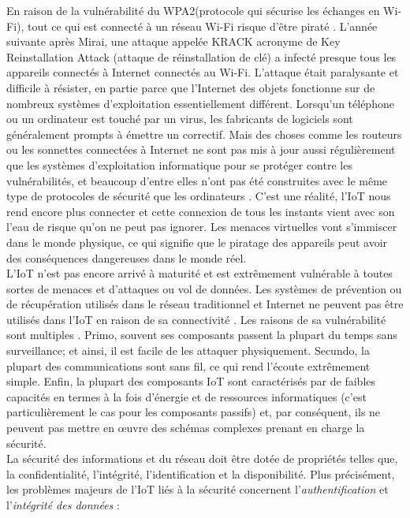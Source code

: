 En raison de la vulnérabilité du WPA2(protocole qui sécurise les échanges en Wi-Fi), tout ce qui est connecté à un réseau Wi-Fi risque d’être piraté \cite{kasperski201krack}. L'année suivante après Mirai, une attaque appelée KRACK acronyme de Key Reinstallation Attack (attaque de réinstallation de clé) a infecté presque tous les appareils connectés à Internet connectés au Wi-Fi. L'attaque était paralysante et dif{\kern0pt}f{\kern0pt}icile à résister, en partie parce que l'Internet des objets fonctionne sur de nombreux systèmes d'exploitation essentiellement dif{\kern0pt}férent. Lorsqu'un téléphone ou un ordinateur est touché par un virus, les fabricants de logiciels sont généralement prompts à émettre un correctif. Mais des choses comme les routeurs ou les sonnettes connectées à Internet ne sont pas mis à jour aussi régulièrement que les systèmes d’exploitation informatique pour se protéger contre les vulnérabilités, et beaucoup d'entre elles n'ont pas été construites avec le même type de protocoles de sécurité que les ordinateurs \cite{pardes2020iot}. C’est une réalité, l’IoT nous rend encore plus connecter et cette connexion de tous les instants vient avec son l’eau de risque qu’on ne peut pas ignorer. Les menaces virtuelles vont s’immiscer dans le monde physique, ce qui signif{\kern0pt}ie que le piratage des appareils peut avoir des conséquences dangereuses dans le monde réel.\\

L'IoT n'est pas encore arrivé à maturité et est extrêmement vulnérable à toutes sortes de menaces et d'attaques ou vol de données. Les systèmes de prévention ou de récupération utilisés dans le réseau traditionnel et Internet ne peuvent pas être utilisés dans l'IoT en raison de sa connectivité \cite{hu2016security}. Les raisons de sa vulnérabilité sont multiples \cite{atzori2010iot}. Primo, souvent ses composants passent la plupart du temps sans surveillance; et ainsi, il est facile de les attaquer physiquement. Secundo, la plupart des communications sont sans f{\kern0pt}il, ce qui rend l'écoute extrêmement simple. Enf{\kern0pt}in, la plupart des composants IoT sont caractérisés par de faibles capacités en termes à la fois d'énergie et de ressources informatiques (c'est particulièrement le cas pour les composants passifs) et, par conséquent, ils ne peuvent pas mettre en œuvre des schémas complexes prenant en charge la sécurité.\\

La sécurité des informations et du réseau doit être dotée de propriétés telles que, la conf{\kern0pt}identialité, l'intégrité, l'identif{\kern0pt}ication et la disponibilité. Plus précisément, les problèmes majeurs de l’IoT liés à la sécurité concernent l'\textit{authentif{\kern0pt}ication} et l'\textit{intégrité des données} \cite{atzori2010iot} : \\

